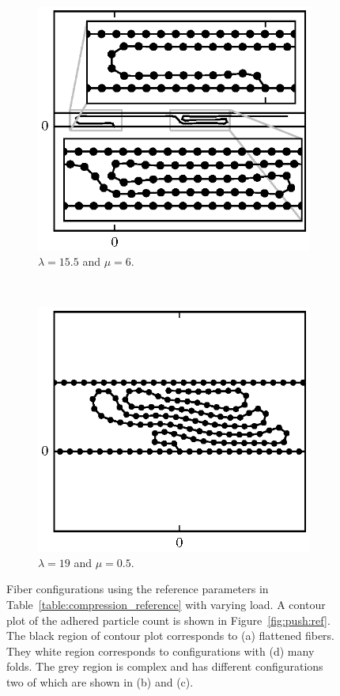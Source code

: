 \begin{figure}[h!]
		\begin{subfigure}{.5\textwidth}
			\centering
			\includegraphics{./fig/ch3/push/ref/l15.5_m6.eps}
			\caption{$\lambda=15.5$ and $\mu=6$.\label{subfig:lonely_pancake}}
		\end{subfigure}%
		~
		\begin{subfigure}{.5\textwidth}
			\centering
			\includegraphics{./fig/ch3/push/ref/l19_m0.5.eps}
			\caption{$\lambda=19$ and $\mu=0.5$.\label{subfig:crushed}}
		\end{subfigure}
		\caption{Fiber configurations using the reference parameters in Table~\ref{table:compression_reference} with varying load. A contour plot of the adhered particle count is shown in Figure~\ref{fig:push:ref}. The black region of contour plot corresponds to (a) flattened fibers. They white region corresponds to configurations with (d) many folds. The grey region is complex and has different configurations two of which are shown in (b) and (c).\label{fig:ref_normal}}
	\end{figure}

